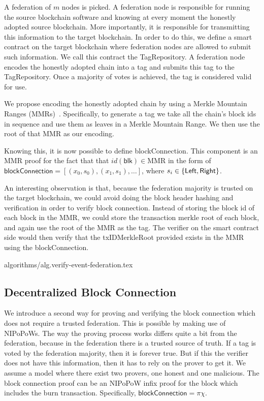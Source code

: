 A federation of $m$ nodes is picked. A federation node is responsible for running the source blockchain software and knowing at every moment the honestly adopted source blockchain. More importantly, it is responsible for transmitting this information to the target blockchain. In order to do this, we define a smart contract on the target blockchain where federation nodes are allowed to submit such information. We call this contract the \textsf{TagRepository}. A federation node encodes the honestly adopted chain into a tag and submits this tag to the \textsf{TagRepository}. Once a majority of votes is achieved, the tag is considered valid for use.

We propose encoding the honestly adopted chain by using a Merkle Mountain Ranges (MMRs)~\cite{flyclient}. Specifically, to generate a tag we take all the chain's block ids in sequence and use them as leaves in a Merkle Mountain Range. We then use the root of that MMR as our encoding.

Knowing this, it is now possible to define \textsf{blockConnection}. This component is an MMR proof for the fact that that $id(\mathsf{blk}) \in \text{MMR}$ in the form of $\mathsf{blockConnection} = [(x_0, s_0), (x_1, s_1), \dots]$, where $s_i \in \sf\{Left, Right\}$.

An interesting observation is that, because the federation majority is trusted on the target blockchain, we could avoid doing the block header hashing and verification in order to verify block connection. Instead of storing the block id of each block in the MMR, we could store the transaction merkle root of each block, and again use the root of the MMR as the tag. The verifier on the smart contract side would then verify that the \textsf{txIDMerkleRoot} provided exists in the MMR using the \textsf{blockConnection}.

{algorithms/alg.verify-event-federation.tex}

\subsection{Decentralized Block Connection}
We introduce a second way for proving and verifying the block connection which does not require a trusted federation. This is possible by making use of NIPoPoWs. The way the proving process works differs quite a bit from the federation, because in the federation there is a trusted source of truth. If a tag is voted by the federation majority, then it is forever true. But if this the verifier does not have this information, then it has to rely on the prover to get it. We assume a model where there exist two provers, one honest and one malicious. The block connection proof can be an NIPoPoW infix proof for the block which includes the burn transaction. Specifically, $\mathsf{blockConnection} = \pi\chi$.

